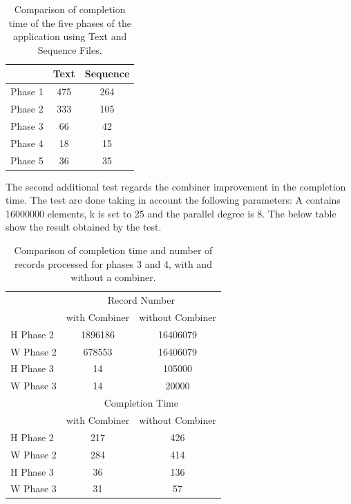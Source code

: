 \begin{table}
\begin{center}
\begin{tabular}{ | l || c | c | }
  \hline      
  & Text & Sequence \\
  \hline      
  Phase 1 & 475 & 264 \\
  Phase 2 & 333 & 105 \\
  Phase 3 & 66 & 42 \\ 
  Phase 4 & 18 & 15 \\
  Phase 5 & 36 & 35 \\
  \hline  
\end{tabular}
\end{center}
\label{tab:textvsSeq}
\caption{Comparison of completion time of the five phases of the application using Text and Sequence Files. }
\end{table}


The second additional test regards the combiner improvement in the completion time. The test are done taking in account the following parameters: A contains 16000000 elements, k is set to 25 and the parallel degree is 8. The below table show the result obtained by the test.

\begin{table}[h!]
\begin{center}

\begin{tabular}{ | l || c | c | }
  \hline      
  & \multicolumn{2}{|c|}{Record Number} \\
  & with Combiner & without Combiner \\
  \hline      
  H Phase 2 & 1896186 & 16406079 \\
  W Phase 2 & 678553 & 16406079 \\ 
  H Phase 3 & 14 & 105000 \\ 
  W Phase 3 & 14 & 20000 \\ 
 \hline  
  \hline      
  & \multicolumn{2}{|c|}{Completion Time} \\
  & with Combiner & without Combiner \\
  \hline      
  H Phase 2 & 217 & 426 \\
  W Phase 2 & 284 & 414 \\ 
  H Phase 3 & 36 & 136 \\ 
  W Phase 3 & 31 & 57 \\ 
 \hline  
\end{tabular}

\end{center}
\caption{Comparison of completion time and number of records processed for phases 3 and 4, with and without a combiner.}
\label{comb_table}
\end{table}














